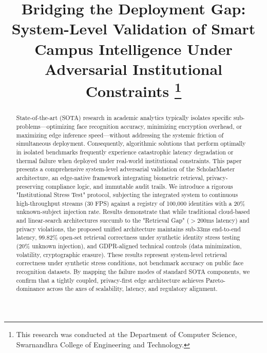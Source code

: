 \documentclass[conference]{IEEEtran}
\begin{document}
\title{Bridging the Deployment Gap: System-Level Validation of Smart Campus Intelligence Under Adversarial Institutional Constraints
\thanks{This research was conducted at the Department of Computer Science, Swarnandhra College of Engineering and Technology.}
}

\author{
}

\maketitle

\begin{abstract}
State-of-the-art (SOTA) research in academic analytics typically isolates specific sub-problems—optimizing face recognition accuracy, minimizing encryption overhead, or maximizing edge inference speed—without addressing the systemic friction of simultaneous deployment. Consequently, algorithmic solutions that perform optimally in isolated benchmarks frequently experience catastrophic latency degradation or thermal failure when deployed under real-world institutional constraints. This paper presents a comprehensive system-level adversarial validation of the ScholarMaster architecture, an edge-native framework integrating biometric retrieval, privacy-preserving compliance logic, and immutable audit trails. We introduce a rigorous "Institutional Stress Test" protocol, subjecting the integrated system to continuous high-throughput streams (30 FPS) against a registry of 100,000 identities with a 20\% unknown-subject injection rate. Results demonstrate that while traditional cloud-based and linear-search architectures succumb to the "Retrieval Gap" ($>200$ms latency) and privacy violations, the proposed unified architecture maintains sub-33ms end-to-end latency, 99.82\% open-set retrieval correctness under synthetic identity stress testing (20\% unknown injection), and GDPR-aligned technical controls (data minimization, volatility, cryptographic erasure). These results represent system-level retrieval correctness under synthetic stress conditions, not benchmark accuracy on public face recognition datasets. By mapping the failure modes of standard SOTA components, we confirm that a tightly coupled, privacy-first edge architecture achieves Pareto-dominance across the axes of scalability, latency, and regulatory alignment.
\end{abstract}
\end{document}
